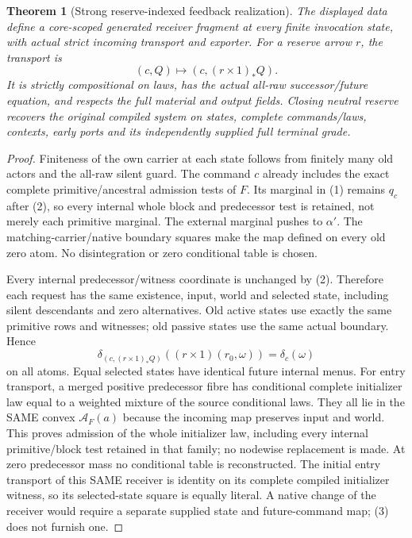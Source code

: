 \documentclass[11pt]{article}
\newtheorem{theorem}{Theorem}
\begin{document}
\begin{theorem}[Strong reserve-indexed feedback realization]
The displayed data define a core-scoped generated receiver fragment at every finite invocation state, with actual strict incoming transport and exporter. For a reserve arrow $r$, the transport is
\[
       (c,Q)\longmapsto(c,(r\times1)_*Q).                    \tag{2}
\]
It is strictly compositional on laws, has the actual all-raw successor/future equation, and respects the full material and output fields. Closing neutral reserve recovers the original compiled system on states, complete commands/laws, contexts, early ports and its independently supplied full terminal grade.
\end{theorem}
\begin{proof}
Finiteness of the own carrier at each state follows from finitely many old actors and the all-raw silent guard. The command $c$ already includes the exact complete primitive/ancestral admission tests of $F$. Its marginal in (1) remains $q_c$ after (2), so every internal whole block and predecessor test is retained, not merely each primitive marginal. The external marginal pushes to $\alpha'$. The matching-carrier/native boundary squares make the map defined on every old zero atom. No disintegration or zero conditional table is chosen.

Every internal predecessor/witness coordinate is unchanged by (2). Therefore each request has the same existence, input, world and selected state, including silent descendants and zero alternatives. Old active states use exactly the same primitive rows and witnesses; old passive states use the same actual boundary. Hence
\[
 \delta_{(c,(r\times1)_*Q)}((r\times1)(r_0,\omega))
                         =\delta_c(\omega)                  \tag{3}
\]
on all atoms. Equal selected states have identical future internal menus. For entry transport, a merged positive predecessor fibre has conditional complete initializer law equal to a weighted mixture of the source conditional laws. They all lie in the SAME convex $\mathcal A_F(a)$ because the incoming map preserves input and world. This proves admission of the whole initializer law, including every internal primitive/block test retained in that family; no nodewise replacement is made. At zero predecessor mass no conditional table is reconstructed. The initial entry transport of this SAME receiver is identity on its complete compiled initializer witness, so its selected-state square is equally literal. A native change of the receiver would require a separate supplied state and future-command map; (3) does not furnish one.


\end{proof}
\end{document}
